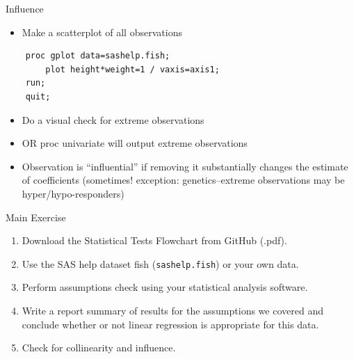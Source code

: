 \documentclass[ignorenonframetext,xcolor=dvipsnames]{beamer}
\begin{document}
\begin{frame}[fragile]{Influence}

\begin{itemize}[<+->]
\itemsep1pt\parskip0pt
\item
  Make a scatterplot of all observations
\end{itemize}

\begin{verbatim}
    proc gplot data=sashelp.fish;
        plot height*weight=1 / vaxis=axis1;
    run;
    quit;
\end{verbatim}

\begin{itemize}[<+->]
\itemsep1pt\parskip0pt
\item
  Do a visual check for extreme observations
\end{itemize}

\begin{itemize}[<+->]
\itemsep1pt\parskip0pt
\item
  OR proc univariate will output extreme observations
\end{itemize}

\begin{itemize}[<+->]
\itemsep1pt\parskip0pt
\item
  Observation is ``influential'' if removing it substantially changes
  the estimate of coefficients (sometimes! exception: genetics--extreme
  observations may be hyper/hypo-responders)
\end{itemize}

\end{frame}

\begin{frame}{Main Exercise}

\begin{enumerate}
\def\labelenumi{\arabic{enumi}.}
\itemsep1pt\parskip0pt
\item
  Download the Statistical Tests Flowchart from GitHub (.pdf).
\item
  Use the SAS help dataset fish (\texttt{sashelp.fish}) or your own
  data.
\item
  Perform assumptions check using your statistical analysis software.
\item
  Write a report summary of results for the assumptions we covered and
  conclude whether or not linear regression is appropriate for this
  data.
\item
  Check for collinearity and influence.
\end{enumerate}

\end{frame}
\end{document}
